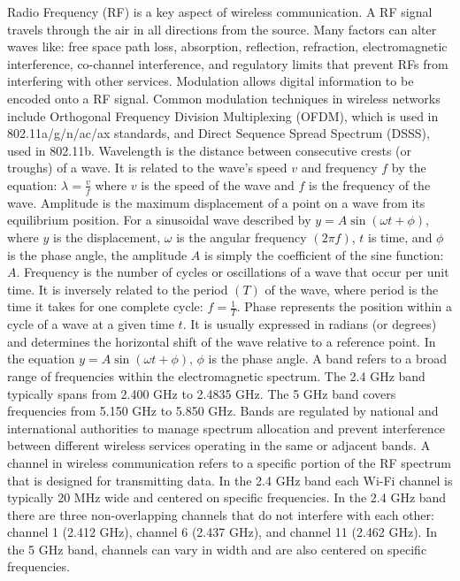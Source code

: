 \documentclass{article}
\begin{document}
	Radio Frequency (RF) is a key aspect of wireless communication. A RF signal travels through the air in all directions from the source. Many factors can alter waves like: free space path loss, absorption, reflection, refraction, electromagnetic interference, co-channel interference, and regulatory limits that prevent RFs from interfering with other services. Modulation allows digital information to be encoded onto a RF signal. Common modulation techniques in wireless networks include Orthogonal Frequency Division Multiplexing (OFDM), which is used in 802.11a/g/n/ac/ax standards, and Direct Sequence Spread Spectrum (DSSS), used in 802.11b. Wavelength is the distance between consecutive crests (or troughs) of a wave. It is related to the wave's speed $v$ and frequency $f$ by the equation: $\lambda = \frac{v}{f}$ where $v$ is the speed of the wave and $f$ is the frequency of the wave. Amplitude is the maximum displacement of a point on a wave from its equilibrium position. For a sinusoidal wave described by $y = A \sin(\omega t + \phi)$, where $y$ is the displacement, $\omega$ is the angular frequency $(2\pi f)$, $t$ is time, and $\phi$ is the phase angle, the amplitude $A$ is simply the coefficient of the sine function: $A$. Frequency is the number of cycles or oscillations of a wave that occur per unit time. It is inversely related to the period $(T)$ of the wave, where period is the time it takes for one complete cycle: $f = \frac{1}{T}$. Phase represents the position within a cycle of a wave at a given time $t$. It is usually expressed in radians (or degrees) and determines the horizontal shift of the wave relative to a reference point. In the equation $y = A \sin(\omega t + \phi)$, $\phi$ is the phase angle. A band refers to a broad range of frequencies within the electromagnetic spectrum. The 2.4 GHz band typically spans from 2.400 GHz to 2.4835 GHz. The 5 GHz band covers frequencies from 5.150 GHz to 5.850 GHz. Bands are regulated by national and international authorities to manage spectrum allocation and prevent interference between different wireless services operating in the same or adjacent bands. A channel in wireless communication refers to a specific portion of the RF spectrum that is designed for transmitting data. In the 2.4 GHz band each Wi-Fi channel is typically 20 MHz wide and centered on specific frequencies. In the 2.4 GHz band there are three non-overlapping channels that do not interfere with each other: channel 1 (2.412 GHz), channel 6 (2.437 GHz), and channel 11 (2.462 GHz). In the 5 GHz band, channels can vary in width and are also centered on specific frequencies.
\end{document}
